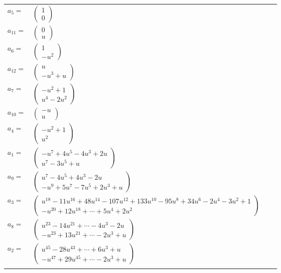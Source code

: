 \documentclass[1p]{elsarticle_modified}
\theoremstyle{definition}
\begin{document}
\begin{tabular}{m{7pt} m{180pt} m{7pt} m{180pt} }
\flushright $a_{5}=$&$\begin{pmatrix}1\\0\end{pmatrix}$ \\
\flushright $a_{11}=$&$\begin{pmatrix}0\\u\end{pmatrix}$ \\
\flushright $a_{6}=$&$\begin{pmatrix}1\\- u^2\end{pmatrix}$ \\
\flushright $a_{12}=$&$\begin{pmatrix}u\\- u^3+u\end{pmatrix}$ \\
\flushright $a_{7}=$&$\begin{pmatrix}- u^2+1\\u^4-2 u^2\end{pmatrix}$ \\
\flushright $a_{10}=$&$\begin{pmatrix}- u\\u\end{pmatrix}$ \\
\flushright $a_{4}=$&$\begin{pmatrix}- u^2+1\\u^2\end{pmatrix}$ \\
\flushright $a_{1}=$&$\begin{pmatrix}- u^7+4 u^5-4 u^3+2 u\\u^7-3 u^5+u\end{pmatrix}$ \\
\flushright $a_{9}=$&$\begin{pmatrix}u^7-4 u^5+4 u^3-2 u\\- u^9+5 u^7-7 u^5+2 u^3+u\end{pmatrix}$ \\
\flushright $a_{3}=$&$\begin{pmatrix}u^{18}-11 u^{16}+48 u^{14}-107 u^{12}+133 u^{10}-95 u^8+34 u^6-2 u^4-3 u^2+1\\- u^{20}+12 u^{18}+\cdots+5 u^4+2 u^2\end{pmatrix}$ \\
\flushright $a_{8}=$&$\begin{pmatrix}u^{23}-14 u^{21}+\cdots-4 u^3-2 u\\- u^{23}+13 u^{21}+\cdots-2 u^3+u\end{pmatrix}$ \\
\flushright $a_{2}=$&$\begin{pmatrix}u^{45}-28 u^{43}+\cdots+6 u^3+u\\- u^{47}+29 u^{45}+\cdots-2 u^3+u\end{pmatrix}$\\&\end{tabular}
\end{document}

